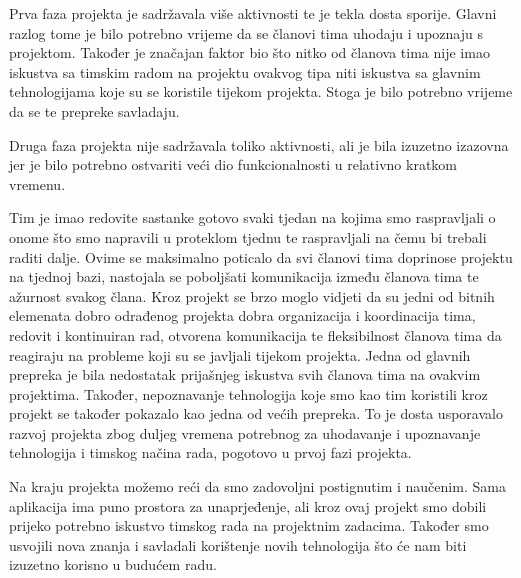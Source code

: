 		Prva faza projekta je sadržavala više aktivnosti te je tekla dosta sporije. Glavni razlog tome je bilo potrebno vrijeme da se članovi tima uhodaju i upoznaju s projektom. Također je značajan faktor bio što nitko od članova tima nije imao iskustva sa timskim radom na projektu ovakvog tipa niti iskustva sa glavnim tehnologijama koje su se koristile tijekom projekta. Stoga je bilo potrebno vrijeme da se te prepreke savladaju.
		
		Druga faza projekta nije sadržavala toliko aktivnosti, ali je bila izuzetno izazovna jer je bilo potrebno ostvariti veći dio funkcionalnosti u relativno kratkom vremenu.
		
		Tim je imao redovite sastanke gotovo svaki tjedan na kojima smo raspravljali o onome što smo napravili u proteklom tjednu te raspravljali na čemu bi trebali raditi dalje. Ovime se maksimalno poticalo da svi članovi tima doprinose projektu na tjednoj bazi, nastojala se poboljšati komunikacija između članova tima te ažurnost svakog člana. Kroz projekt se brzo moglo vidjeti da su jedni od bitnih elemenata dobro odrađenog projekta dobra organizacija i koordinacija tima, redovit i kontinuiran rad, otvorena komunikacija te fleksibilnost članova tima da reagiraju na probleme koji su se javljali tijekom projekta. Jedna od glavnih prepreka je bila nedostatak prijašnjeg iskustva svih članova tima na ovakvim projektima. Također, nepoznavanje tehnologija koje smo kao tim koristili kroz projekt se također pokazalo kao jedna od većih prepreka. To je dosta usporavalo razvoj projekta zbog duljeg vremena potrebnog za uhodavanje i upoznavanje tehnologija i timskog načina rada, pogotovo u prvoj fazi projekta.
		
		Na kraju projekta možemo reći da smo zadovoljni postignutim i naučenim. Sama aplikacija ima puno prostora za unaprjeđenje, ali kroz ovaj projekt smo dobili prijeko potrebno iskustvo timskog rada na projektnim zadacima. Također smo usvojili nova znanja i savladali korištenje novih tehnologija što će nam biti izuzetno korisno u budućem radu. 
		\eject 